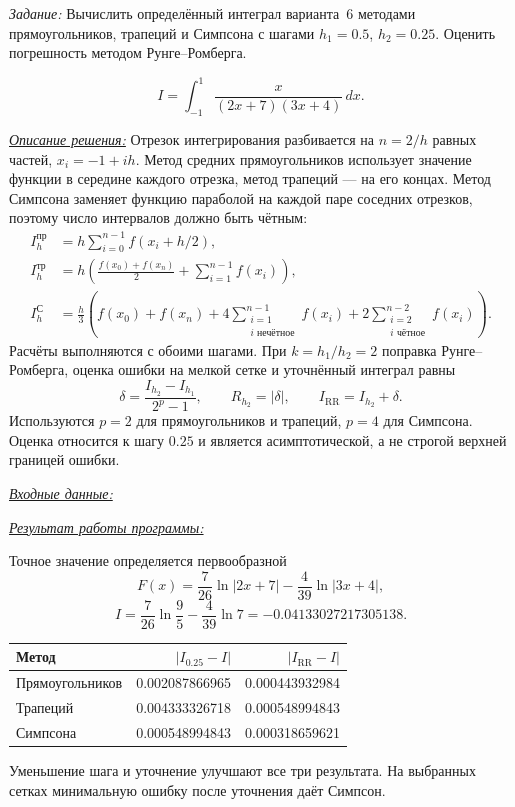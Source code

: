 \documentclass[a4paper,12pt]{article}
\newcommand{\labheading}[1]{\clearpage\noindent\hspace*{\parindent}{\fontsize{16}{19}\selectfont\bfseries Лабораторная работа № #1}\par\vspace{11pt}}
\newcommand{\task}[1]{\indent\textit{Задание:} #1\par}
\newcommand{\solution}[1]{\par\vspace{9pt}\indent\underline{\textit{Описание решения:}} #1}
\newcommand{\blocktitle}[1]{\par\Needspace{4\baselineskip}\vspace{9pt}\indent\underline{\textit{#1}}\par\vspace{4pt}}
\begin{document}
\labheading{3.5}
\task{Вычислить определённый интеграл варианта~6 методами
прямоугольников, трапеций и Симпсона с шагами $h_1=0.5$,
$h_2=0.25$. Оценить погрешность методом Рунге--Ромберга.}
\[
I=\int_{-1}^{1}\frac{x}{(2x+7)(3x+4)}\,dx.
\]
\solution{}
Отрезок интегрирования разбивается на $n=2/h$ равных частей,
$x_i=-1+ih$. Метод средних прямоугольников использует значение
функции в середине каждого отрезка, метод трапеций --- на его концах.
Метод Симпсона заменяет функцию параболой на каждой паре соседних
отрезков, поэтому число интервалов должно быть чётным:
\[
\begin{aligned}
I_h^{\mathrm{пр}}&=h\sum_{i=0}^{n-1}f(x_i+h/2),\\
I_h^{\mathrm{тр}}&=h\left(\frac{f(x_0)+f(x_n)}2+
\sum_{i=1}^{n-1}f(x_i)\right),\\
I_h^{\mathrm{С}}&=\frac h3\left(f(x_0)+f(x_n)
+4\sum_{\substack{i=1\\i\text{ нечётное}}}^{n-1}f(x_i)
+2\sum_{\substack{i=2\\i\text{ чётное}}}^{n-2}f(x_i)\right).
\end{aligned}
\]
Расчёты выполняются с обоими шагами. При $k=h_1/h_2=2$
поправка Рунге--Ромберга, оценка ошибки на мелкой сетке и
уточнённый интеграл равны
\[
\delta=\frac{I_{h_2}-I_{h_1}}{2^p-1},\qquad
R_{h_2}=|\delta|,\qquad I_{\mathrm{RR}}=I_{h_2}+\delta.
\]
Используются $p=2$ для прямоугольников и трапеций, $p=4$ для
Симпсона. Оценка относится к шагу $0.25$ и является
асимптотической, а не строгой верхней границей ошибки.
\blocktitle{Входные данные:}
\blocktitle{Результат работы программы:}
Точное значение определяется первообразной
\[
F(x)=\frac7{26}\ln|2x+7|-\frac4{39}\ln|3x+4|,
\]
\[
I=\frac7{26}\ln\frac95-\frac4{39}\ln7
=-0.04133027217305138.
\]
\begin{center}
\begin{tabular}{lrr}
\toprule
Метод & $|I_{0.25}-I|$ & $|I_{\mathrm{RR}}-I|$\\
\midrule
Прямоугольников & 0.002087866965 & 0.000443932984\\
Трапеций & 0.004333326718 & 0.000548994843\\
Симпсона & 0.000548994843 & 0.000318659621\\
\bottomrule
\end{tabular}
\end{center}
Уменьшение шага и уточнение улучшают все три результата.
На выбранных сетках минимальную ошибку после уточнения даёт Симпсон.
\end{document}
